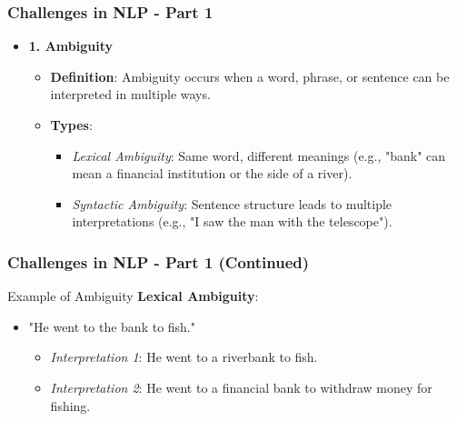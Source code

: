 \documentclass{beamer}
\begin{document}
\begin{frame}[fragile]
    \frametitle{Challenges in NLP - Part 1}
    \begin{itemize}
        \item \textbf{1. Ambiguity}
        \begin{itemize}
            \item \textbf{Definition}: Ambiguity occurs when a word, phrase, or sentence can be interpreted in multiple ways.
            \item \textbf{Types}:
            \begin{itemize}
                \item \textit{Lexical Ambiguity}: Same word, different meanings (e.g., "bank" can mean a financial institution or the side of a river).
                \item \textit{Syntactic Ambiguity}: Sentence structure leads to multiple interpretations (e.g., "I saw the man with the telescope").
            \end{itemize}
        \end{itemize}
    \end{itemize}
\end{frame}

\begin{frame}[fragile]
    \frametitle{Challenges in NLP - Part 1 (Continued)}
    \begin{block}{Example of Ambiguity}
        \textbf{Lexical Ambiguity}: 
        \begin{itemize}
            \item "He went to the bank to fish."
            \begin{itemize}
                \item \textit{Interpretation 1}: He went to a riverbank to fish.
                \item \textit{Interpretation 2}: He went to a financial bank to withdraw money for fishing.
            \end{itemize}
        \end{itemize}
    \end{block}
\end{frame}
\end{document}
